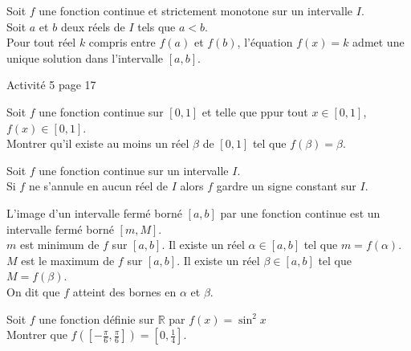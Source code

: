 \documentclass[12pt,a4paper,x11names,usenames,dvipsnames,svgnames,oneside]{book}
\def\R{\mathbb{R}}
\begin{document}
\begin{thr}
Soit $f$ une fonction continue et strictement monotone sur un intervalle $I$.\\
Soit $a$ et $b$ deux réels de $I$ tels que $a<b$.\\
Pour tout réel $k$ compris entre $f(a)$ et $f(b)$, l'équation $f(x)=k$ admet une unique solution dans l'intervalle $\left[ {a,b} \right]$.
\end{thr}
\begin{act}
Activité 5 page 17
\end{act}
\begin{act}
Soit $f$ une fonction continue sur $\left[ {0,1} \right]$ et telle que ppur tout $x\in\left[ {0,1} \right]$, $f(x)\in\left[ {0,1} \right]$.\\
Montrer qu'il existe au moins un réel $\beta$ de $\left[ {0,1} \right]$ tel que $f(\beta)=\beta$.
\end{act}
\begin{thr}
Soit $f$ une fonction continue sur un intervalle $I$.\\
Si $f$ ne s'annule en aucun réel de $I$ alors $f$ gardre un signe constant sur $I$.
\end{thr}
\begin{dem}

\end{dem}
\begin{thr}
L'image d'un intervalle fermé borné $\left[ {a,b} \right]$ par une fonction continue est un intervalle fermé borné $\left[ {m,M} \right]$.\\
$m$ est minimum de $f$ sur $\left[ {a,b} \right]$. Il existe un réel $\alpha \in \left[ {a,b} \right]$ tel que $m=f(\alpha)$.\\
$M$ est le maximum de $f$ sur $\left[ {a,b} \right]$. Il existe un réel $\beta\in \left[ {a,b} \right]$ tel que $M=f(\beta)$.\\
On dit que $f$ atteint des bornes en $\alpha$ et $\beta$.
\end{thr}
\begin{exr}
Soit $f$ une fonction définie sur $\R$ par $f(x)=\sin^2x$\\
Montrer que $f\left( {\left[ { - \frac{\pi }
{6},\frac{\pi }
{6}} \right]} \right) = \left[ {0,\frac{1}
{4}} \right]$.
\end{exr}
\end{document}
